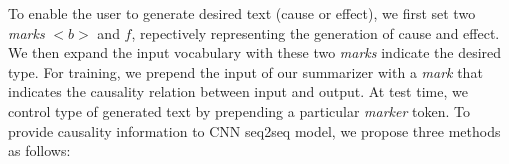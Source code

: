 To enable the user to generate desired text (cause or effect), 
we first set two \textit{marks} $<b>$ and $f$, 
repectively representing the generation of cause and effect. 
We then expand the input vocabulary with these two \textit{marks} 
indicate the desired type. For training,
we prepend the input of our summarizer with a \textit{mark} 
that indicates the causality relation between input and output.
At test time, we control type of generated
text by prepending a particular \textit{marker} token.
To provide causality information to CNN seq2seq model,
we propose three methods as follows:
